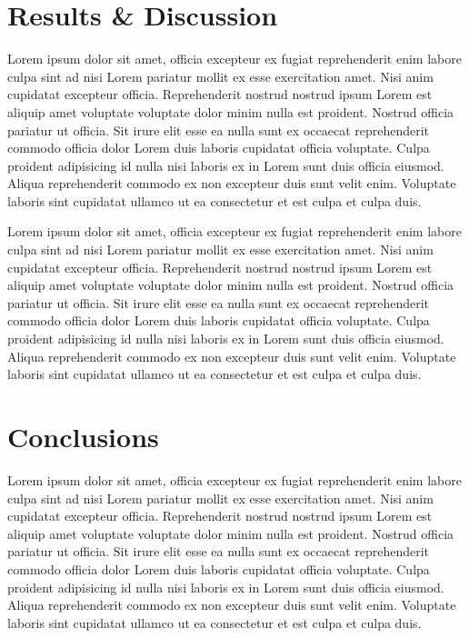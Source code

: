 \documentclass[11pt]{report}
\begin{document}
\newpage

\section*{Results \& Discussion}
Lorem ipsum dolor sit amet, officia excepteur ex fugiat reprehenderit enim labore culpa sint ad nisi
Lorem pariatur mollit ex esse exercitation amet. Nisi anim cupidatat excepteur officia.
Reprehenderit nostrud nostrud ipsum Lorem est aliquip amet voluptate voluptate dolor minim nulla est
proident. Nostrud officia pariatur ut officia. Sit irure elit esse ea nulla sunt ex occaecat
reprehenderit commodo officia dolor Lorem duis laboris cupidatat officia voluptate. Culpa proident
adipisicing id nulla nisi laboris ex in Lorem sunt duis officia eiusmod. Aliqua reprehenderit
commodo ex non excepteur duis sunt velit enim. Voluptate laboris sint cupidatat ullamco ut ea
consectetur et est culpa et culpa duis.

Lorem ipsum dolor sit amet, officia excepteur ex fugiat reprehenderit enim labore culpa sint ad nisi
Lorem pariatur mollit ex esse exercitation amet. Nisi anim cupidatat excepteur officia.
Reprehenderit nostrud nostrud ipsum Lorem est aliquip amet voluptate voluptate dolor minim nulla est
proident. Nostrud officia pariatur ut officia. Sit irure elit esse ea nulla sunt ex occaecat
reprehenderit commodo officia dolor Lorem duis laboris cupidatat officia voluptate. Culpa proident
adipisicing id nulla nisi laboris ex in Lorem sunt duis officia eiusmod. Aliqua reprehenderit
commodo ex non excepteur duis sunt velit enim. Voluptate laboris sint cupidatat ullamco ut ea
consectetur et est culpa et culpa duis.

\section*{Conclusions}
Lorem ipsum dolor sit amet, officia excepteur ex fugiat reprehenderit enim labore culpa sint ad nisi
Lorem pariatur mollit ex esse exercitation amet. Nisi anim cupidatat excepteur officia.
Reprehenderit nostrud nostrud ipsum Lorem est aliquip amet voluptate voluptate dolor minim nulla est
proident. Nostrud officia pariatur ut officia. Sit irure elit esse ea nulla sunt ex occaecat
reprehenderit commodo officia dolor Lorem duis laboris cupidatat officia voluptate. Culpa proident
adipisicing id nulla nisi laboris ex in Lorem sunt duis officia eiusmod. Aliqua reprehenderit
commodo ex non excepteur duis sunt velit enim. Voluptate laboris sint cupidatat ullamco ut ea
consectetur et est culpa et culpa duis.
\end{document}
